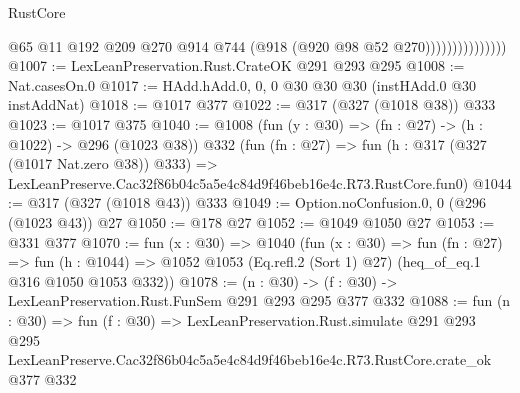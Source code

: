 \begin{lexlean}{RustCore}
\begin{coremodule}
                              @65
                              @11
                              @192
                              @209
                              @270
                              @914
                              @744
                              (@918 (@920 @98 @52 @270)))))))))))))))
@1007 := LexLeanPreservation.Rust.CrateOK @291 @293 @295
@1008 := Nat.casesOn.{0}
@1017 := HAdd.hAdd.{0, 0, 0} @30 @30 @30 (instHAdd.{0} @30 instAddNat)
@1018 := @1017 @377
@1022 := @317 (@327 (@1018 @38)) @333
@1023 := @1017 @375
@1040 := @1008
    (fun (y : @30) => (fn : @27) -> (h : @1022) -> @296 (@1023 @38))
    @332
    (fun (fn : @27) =>
    fun (h : @317 (@327 (@1017 Nat.zero @38)) @333) =>
    LexLeanPreserve.Cac32f86b04c5a5e4c84d9f46beb16e4c.R73.RustCore.fun0)
@1044 := @317 (@327 (@1018 @43)) @333
@1049 := Option.noConfusion.{0, 0} (@296 (@1023 @43)) @27
@1050 := @178 @27
@1052 := @1049 @1050 @27
@1053 := @331 @377
@1070 := fun (x : @30) =>
  @1040
    (fun (x : @30) =>
    fun (fn : @27) =>
    fun (h : @1044) => @1052 @1053 (Eq.refl.{2} (Sort 1) @27) (heq_of_eq.{1} @316 @1050 @1053 @332))
@1078 := (n : @30) -> (f : @30) -> LexLeanPreservation.Rust.FunSem @291 @293 @295 @377 @332
@1088 := fun (n : @30) =>
  fun (f : @30) =>
  LexLeanPreservation.Rust.simulate
    @291
    @293
    @295
    LexLeanPreserve.Cac32f86b04c5a5e4c84d9f46beb16e4c.R73.RustCore.crate_ok
    @377
    @332
\end{coremodule}
\end{lexlean}
